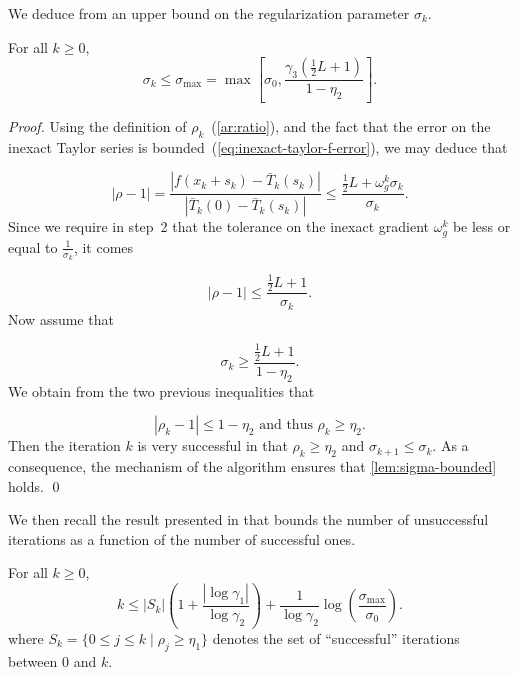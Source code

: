 \documentclass[runningheads,orivec,oribibl]{llncs}
\begin{document}
We deduce from \cite[Lemma~2.2]{birgin-gardenghi-martinez-santos-toint-2017} an upper bound on the regularization parameter \(\sigma_k\).

\begin{lemma}
  \label{lem:sigma-bounded}
  For all \(k \geq 0\),
  \begin{equation*}
    \sigma_k \leq \sigma_{\max} = \max
    \left[\sigma_0, \frac{\gamma_3 (\tfrac{1}{2}L+1)}{1-\eta_2} \right].
  \end{equation*}
\end{lemma}

\begin{proof}
  Using the definition of $\rho_k$~(\ref{ar:ratio}), and the fact that the error on the inexact Taylor series is bounded~(\ref{eq:inexact-taylor-f-error}), we may deduce that

  \begin{equation*}
    |\rho - 1| = \frac{|f(x_k+s_k) - \bar{T}_k(s_k)|}{|\bar{T}_k(0)-\bar{T}_k(s_k)|} \leq \frac{ \tfrac{1}{2} L + \omega_g^k\sigma_k}{\sigma_k}.
  \end{equation*}
  Since we require in step~2 that the tolerance on the inexact gradient \(\omega_g^k\) be less or equal to \(\tfrac{1}{\sigma_k}\), it comes

  \begin{equation*}
    |\rho - 1| \leq \frac{\tfrac{1}{2} L + 1}{\sigma_k}.
  \end{equation*}
  Now assume that

  \begin{equation*}
    \sigma_k \geq \frac{\tfrac{1}{2}L+1}{1-\eta_2}.
  \end{equation*}
  We obtain from the two previous inequalities that

  \begin{equation*}
    |\rho_k-1| \leq 1-\eta_2 \text{ and thus } \rho_k \geq \eta_2.
  \end{equation*}
  Then the iteration \(k\) is very successful in that \(\rho_k \geq \eta_2\) and \(\sigma_{k+1} \leq \sigma_k\).
  As a consequence, the mechanism of the algorithm ensures that \autoref{lem:sigma-bounded} holds.
\qed
\end{proof}
We then recall the result presented in \cite[Lemma~2.4]{birgin-gardenghi-martinez-santos-toint-2017} that bounds the number of unsuccessful iterations as a function of the number of successful ones.

\begin{lemma}
  \label{lem:k-bounded}
  For all \(k\geq 0\),
  \begin{equation}
    k \leq |S_k| \left( 1+\frac{|\log\gamma_1|}{\log\gamma_2} \right) + \frac{1}{\log\gamma_2} \log \left( \frac{\sigma_{\max}}{\sigma_0} \right).
  \end{equation}
  where \(S_k = \{0\leq j \leq k \mid \rho_j \geq \eta_1\}\) denotes the set of ``successful'' iterations between \(0\) and \(k\).
\end{lemma}
\end{document}
